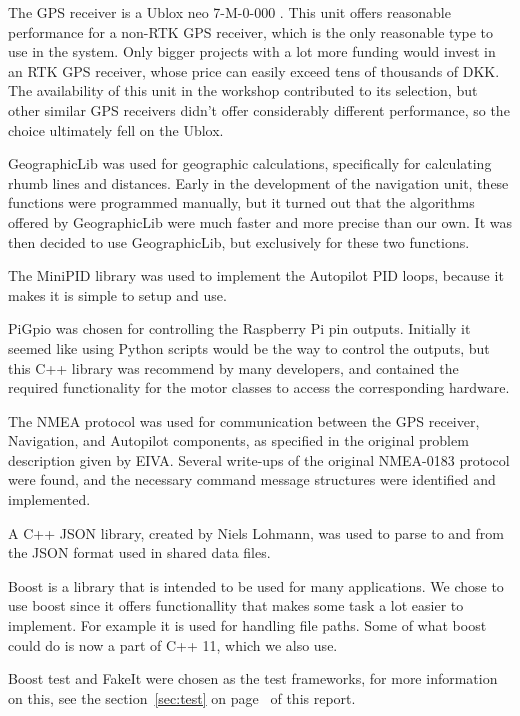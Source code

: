 The GPS receiver is a Ublox neo 7-M-0-000 \cite{ublox-datasheet}. This unit offers reasonable performance for a non-RTK GPS receiver, which is the only reasonable type to use in the system. Only bigger projects with a lot more funding would invest in an RTK GPS receiver, whose price can easily exceed tens of thousands of DKK. The availability of this unit in the workshop contributed to its selection, but other similar GPS receivers didn't offer considerably different performance, so the choice ultimately fell on the Ublox.

GeographicLib\cite{geographiclib} was used for geographic calculations, specifically for calculating rhumb lines and distances. Early in the development of the navigation unit, these functions were programmed manually, but it turned out that the algorithms offered by GeographicLib were much faster and more precise than our own. It was then decided to use GeographicLib, but exclusively for these two functions.

The MiniPID \cite{minipid} library was used to implement the Autopilot PID loops, because it makes it is simple to setup and use.

PiGpio \cite{pigpio} was chosen for controlling the Raspberry Pi pin outputs. Initially it seemed like using Python scripts would be the way to control the outputs, but this C++ library was recommend by many developers, and contained the required functionality for the motor classes to access the corresponding hardware.

The NMEA \cite{NMEA} protocol was used for communication between the GPS receiver, Navigation, and Autopilot components, as specified in the original problem description given by EIVA. Several write-ups of the original NMEA-0183 protocol were found, and the necessary command message structures were identified and implemented.

A C++ JSON library, created by Niels Lohmann\cite{json}, was used to parse to and from the JSON format\cite{jsobjectnotation} used in shared data files.

Boost is a library that is intended to be used for many applications\cite{boost}. We chose to use boost since it offers functionallity that makes some task a lot easier to implement. For example it is used for handling file paths. Some of what boost could do is now a part of C++ 11, which we also use.

Boost test and FakeIt \cite{fakeit} were chosen as the test frameworks, for more information on this, see the section~\ref{sec:test} on page~\pageref{sec:test} of this report.